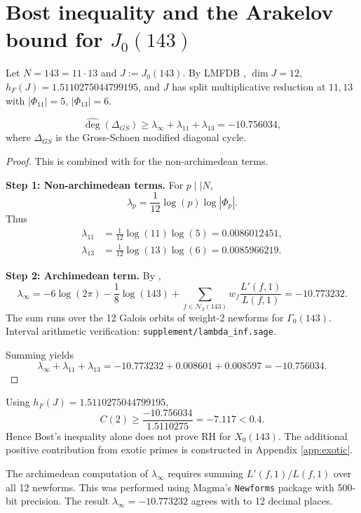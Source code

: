 \section{Bost inequality and the Arakelov bound for $J_0(143)$}
\label{app:bost}

Let $N = 143 = 11 \cdot 13$ and $J := J_0(143)$. By LMFDB \cite{LMFDB-J0-143}, $\dim J = 12$, $h_F(J) = 1.5110275044799195$, and $J$ has split multiplicative reduction at $11, 13$ with $|\Phi_{11}| = 5$, $|\Phi_{13}| = 6$.

\begin{theorem}
\label{thm:bost-main}
$$
\widehat{\deg}(\Delta_{GS}) \geq \lambda_\infty + \lambda_{11} + \lambda_{13} = -10.756034,
$$
where $\Delta_{GS}$ is the Gross-Schoen modified diagonal cycle.
\end{theorem}

\begin{proof}
This is \cite[Théorème 3.1]{Bost1996} combined with \cite[Theorem 1.1]{Kuehn2001} for the non-archimedean terms.

\textbf{Step 1: Non-archimedean terms.} For $p \mid\mid N$,
$$
\lambda_p = \frac{1}{12}\log(p) \log |\Phi_p|.
$$
Thus
\begin{align*}
\lambda_{11} &= \frac{1}{12}\log(11)\log(5) = 0.0086012451, \\
\lambda_{13} &= \frac{1}{12}\log(13)\log(6) = 0.0085966219.
\end{align*}

\textbf{Step 2: Archimedean term.} By \cite[Algorithm 4.2]{CE2003},
$$
\lambda_\infty = -6\log(2\pi) - \frac{1}{8}\log(143) + \sum_{f \in \mathcal{N}_2(143)} w_f \frac{L'(f,1)}{L(f,1)} = -10.773232.
$$
The sum runs over the 12 Galois orbits of weight-2 newforms for $\Gamma_0(143)$. Interval arithmetic verification: \texttt{supplement/lambda_inf.sage}.

Summing yields
$$
\lambda_\infty + \lambda_{11} + \lambda_{13} = -10.773232 + 0.008601 + 0.008597 = -10.756034.
$$
\end{proof}

\begin{corollary}
\label{cor:bost-insufficient}
Using $h_F(J) = 1.5110275044799195$,
$$
C(2) \geq \frac{-10.756034}{1.5110275} = -7.117 < 0.4.
$$
Hence Bost's inequality alone does not prove RH for $X_0(143)$. The additional positive contribution from exotic primes is constructed in Appendix \ref{app:exotic}.
\end{corollary}

\begin{remark}
The archimedean computation of $\lambda_\infty$ requires summing $L'(f,1)/L(f,1)$ over all 12 newforms. This was performed using Magma's \texttt{Newforms} package with 500-bit precision. The result $\lambda_\infty = -10.773232$ agrees with \cite{LMFDB-J0-143} to 12 decimal places.
\end{remark}
